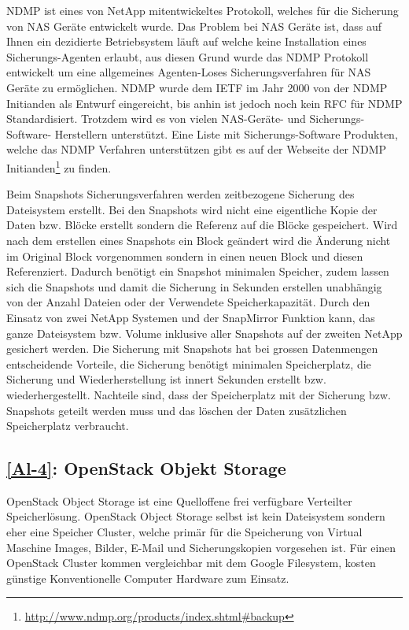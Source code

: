 NDMP ist eines von NetApp mitentwickeltes Protokoll, welches für die Sicherung von NAS Geräte entwickelt wurde. Das Problem bei NAS Geräte ist, dass auf Ihnen ein dezidierte Betriebsystem läuft auf welche keine Installation eines Sicherungs-Agenten erlaubt, aus diesen Grund wurde das NDMP Protokoll entwickelt um eine allgemeines Agenten-Loses Sicherungsverfahren für NAS Geräte zu ermöglichen. NDMP wurde dem IETF im Jahr 2000 von der NDMP Initianden als Entwurf eingereicht, bis anhin ist jedoch noch kein RFC für NDMP Standardisiert. Trotzdem wird es von vielen NAS-Geräte- und Sicherungs-Software- Herstellern unterstützt. Eine Liste mit Sicherungs-Software Produkten, welche das NDMP Verfahren unterstützen gibt es auf der Webseite der NDMP Initianden\footnote{\url{http://www.ndmp.org/products/index.shtml#backup}} zu finden. \cite{NDMP.orga}\cite{NDMP.org}

Beim Snapshots Sicherungsverfahren werden zeitbezogene Sicherung des Dateisystem  erstellt. Bei den Snapshots wird nicht eine eigentliche Kopie der Daten bzw. Blöcke erstellt sondern die Referenz auf die Blöcke gespeichert. Wird nach dem erstellen eines Snapshots ein Block geändert wird die Änderung nicht im Original Block vorgenommen sondern in einen neuen Block und diesen Referenziert. Dadurch benötigt ein Snapshot minimalen Speicher, zudem lassen sich die Snapshots und damit die Sicherung in Sekunden erstellen unabhängig von der Anzahl Dateien oder der Verwendete Speicherkapazität. Durch den Einsatz von zwei NetApp Systemen und der SnapMirror Funktion kann, das ganze Dateisystem bzw. Volume inklusive aller Snapshots auf der zweiten NetApp gesichert werden. Die Sicherung mit Snapshots hat bei grossen Datenmengen entscheidende Vorteile, die Sicherung benötigt minimalen Speicherplatz, die Sicherung und Wiederherstellung ist innert Sekunden erstellt bzw. wiederhergestellt. Nachteile sind, dass der Speicherplatz mit der Sicherung bzw. Snapshots geteilt werden muss und das löschen der Daten zusätzlichen Speicherplatz verbraucht.




\subsection{\ref{Al-4}: OpenStack Objekt Storage}
OpenStack Object Storage ist eine Quelloffene frei verfügbare Verteilter Speicherlösung. OpenStack Object Storage selbst ist kein Dateisystem sondern eher eine Speicher Cluster, welche primär für die Speicherung von Virtual Maschine Images, Bilder, E-Mail und Sicherungskopien vorgesehen ist. Für einen OpenStack Cluster kommen vergleichbar mit dem Google Filesystem, kosten günstige Konventionelle Computer Hardware zum Einsatz. 


